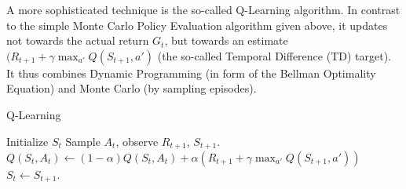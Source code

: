 A more sophisticated technique is the so-called Q-Learning algorithm. In contrast to the simple Monte Carlo Policy Evaluation algorithm given above, it updates not towards the actual return $G_t$, but towards an estimate $(R_{t+1} + \gamma \max_{a'} Q(S_{t+1},a')$ (the so-called Temporal Difference (TD) target). It thus combines Dynamic Programming (in form of the Bellman Optimality Equation) and Monte Carlo (by sampling episodes).

\begin{algorithm}[h!]
\label{algo:q-learning}
   \caption{Q-Learning}
\begin{algorithmic}[1]
\STATE Initialize $S_t$
\STATE Sample $A_t$, observe $R_{t+1}$, $S_{t+1}$.
\STATE $Q(S_t,A_t) \leftarrow (1 - \alpha) Q(S_t,A_t) + \alpha (R_{t+1} + \gamma \max_{a'} Q(S_{t+1},a'))$
\STATE $S_t \leftarrow S_{t+1}$.
\ENDFOR
	\ENDFOR
\end{algorithmic}
\end{algorithm}


